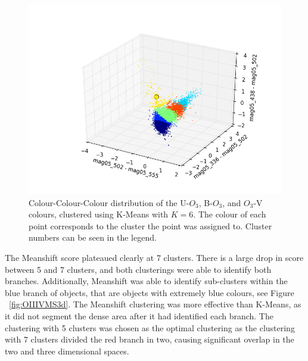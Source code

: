\begin{figure}
\centering
\includegraphics[width=\linewidth]{figs/kmeans_3d_color_6cl_mag05_502-mag05_555vsmag05_336-mag05_502vsmag05_438-mag05_502}
\caption{Colour-Colour-Colour distribution of the U-$O_{3}$, B-$O_{3}$, and $O_{3}$-V colours, clustered using K-Means with $K=6$. The colour of each point corresponds to the cluster the point was assigned to. Cluster numbers can be seen in the legend.}
\label{fig:fig:OIIIVKM3d}
\end{figure}

The Meanshift score plateaued clearly at 7 clusters. There is a large drop in score between 5 and 7 clusters, and both clusterings were able to identify both branches.
Additionally, Meanshift was able to identify sub-clusters within the blue branch of objects, that are objects with extremely blue colours, see Figure ~\ref{fig:OIIIVMS3d}.
The Meanshift clustering was more effective than K-Means, as it did not segment the dense area after it had identified each branch.
The clustering with 5 clusters was chosen as the optimal clustering as the clustering with 7 clusters divided the red branch in two, causing significant overlap in the two and three dimensional spaces.


